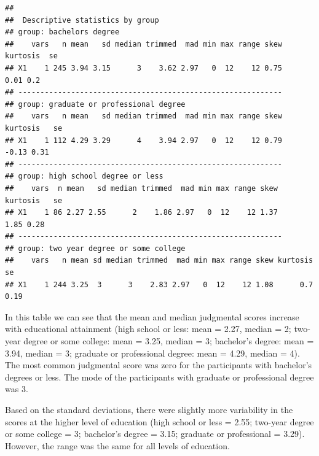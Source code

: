 \documentclass[
]{book}
\begin{document}
\begin{verbatim}
## 
##  Descriptive statistics by group 
## group: bachelors degree
##    vars   n mean   sd median trimmed  mad min max range skew kurtosis  se
## X1    1 245 3.94 3.15      3    3.62 2.97   0  12    12 0.75     0.01 0.2
## ------------------------------------------------------------ 
## group: graduate or professional degree
##    vars   n mean   sd median trimmed  mad min max range skew kurtosis   se
## X1    1 112 4.29 3.29      4    3.94 2.97   0  12    12 0.79    -0.13 0.31
## ------------------------------------------------------------ 
## group: high school degree or less
##    vars  n mean   sd median trimmed  mad min max range skew kurtosis   se
## X1    1 86 2.27 2.55      2    1.86 2.97   0  12    12 1.37     1.85 0.28
## ------------------------------------------------------------ 
## group: two year degree or some college
##    vars   n mean sd median trimmed  mad min max range skew kurtosis   se
## X1    1 244 3.25  3      3    2.83 2.97   0  12    12 1.08      0.7 0.19
\end{verbatim}

In this table we can see that the mean and median judgmental scores increase with educational attainment (high school or less: mean = 2.27, median = 2; two-year degree or some college: mean = 3.25, median = 3; bachelor's degree: mean = 3.94, median = 3; graduate or professional degree: mean = 4.29, median = 4). The most common judgmental score was zero for the participants with bachelor's degrees or less. The mode of the participants with graduate or professional degree was 3.

Based on the standard deviations, there were slightly more variability in the scores at the higher level of education (high school or less = 2.55; two-year degree or some college = 3; bachelor's degree = 3.15; graduate or professional = 3.29). However, the range was the same for all levels of education.

  
\end{document}
